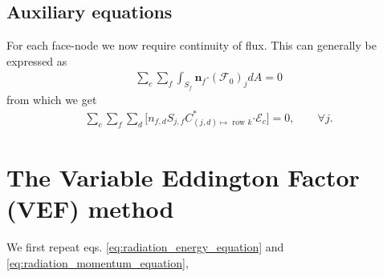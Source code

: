 \documentclass[10pt,letterpaper,notitlepage]{article}
\numberwithin{equation}{section}
\newcommand{\dotp}{\boldsymbol{\cdot}}
\newcommand{\RadE}{\mathcal{E}}
\newcommand{\RadF}{\boldsymbol{\mathcal{F}}}
\newcommand{\beqn}{\begin{equation}\begin{aligned}}
\newcommand{\eeqn}{\end{aligned}\end{equation}}
\begin{document}
\subsection{Auxiliary equations}
For each face-node we now require continuity of flux. This can generally be expressed as
\beqn 
\sum_c \sum_f \int_{S_f} \mathbf{n}_f \dotp (\RadF_0)_j dA = 0
\eeqn 
from which we get
\beqn 
\sum_c \sum_f \sum_d  \biggr[ n_{f,d} S_{j,f} C_{(j,d)\mapsto \text{ row } k}^* \dotp \boldsymbol{\RadE}_c \biggr] = 0,
\quad \quad \forall j.
\eeqn 


\newpage 
\section{The Variable Eddington Factor (VEF) method}
We first repeat eqs. \eqref{eq:radiation_energy_equation} and \eqref{eq:radiation_momentum_equation},
\end{document}
